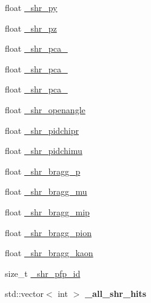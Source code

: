 \begin{DoxyCompactItemize}
\item 
float \hyperlink{classselection_1_1CC0piNpSelection_a436dd7081c84003dabb595289d745111}{\+\_\+shr\+\_\+py}
\item 
float \hyperlink{classselection_1_1CC0piNpSelection_a769319ad32b6ce49c7a5283b246303fa}{\+\_\+shr\+\_\+pz}
\item 
float \hyperlink{classselection_1_1CC0piNpSelection_a47b08d4ae98f51032f431873321914a5}{\+\_\+shr\+\_\+pca\+\_}
\item 
float \hyperlink{classselection_1_1CC0piNpSelection_ae3ce85b9e7002cfac57e433ee131868d}{\+\_\+shr\+\_\+pca\+\_}
\item 
float \hyperlink{classselection_1_1CC0piNpSelection_a7e5a1ac6cd32eec7da00eb45c49df0cd}{\+\_\+shr\+\_\+pca\+\_}
\item 
float \hyperlink{classselection_1_1CC0piNpSelection_a33b26acb3cdb05cb1b81800d8af48a03}{\+\_\+shr\+\_\+openangle}
\item 
float \hyperlink{classselection_1_1CC0piNpSelection_aae9294d7e4803ff991e611ea124769bc}{\+\_\+shr\+\_\+pidchipr}
\item 
float \hyperlink{classselection_1_1CC0piNpSelection_a63840908c268c89d30e6728ac6cb1036}{\+\_\+shr\+\_\+pidchimu}
\item 
float \hyperlink{classselection_1_1CC0piNpSelection_acb447ca93f046abd1540291ba0d41e73}{\+\_\+shr\+\_\+bragg\+\_\+p}
\item 
float \hyperlink{classselection_1_1CC0piNpSelection_a6ef67d022fce5058985773010161b7cb}{\+\_\+shr\+\_\+bragg\+\_\+mu}
\item 
float \hyperlink{classselection_1_1CC0piNpSelection_ae18587d33433c508bd3e371de8db7b32}{\+\_\+shr\+\_\+bragg\+\_\+mip}
\item 
float \hyperlink{classselection_1_1CC0piNpSelection_afa97d9a456bf2255e06c6c5226f25929}{\+\_\+shr\+\_\+bragg\+\_\+pion}
\item 
float \hyperlink{classselection_1_1CC0piNpSelection_a0fae2cdec5a695421cbe2fdfe6e61c9d}{\+\_\+shr\+\_\+bragg\+\_\+kaon}
\item 
size\+\_\+t \hyperlink{classselection_1_1CC0piNpSelection_a21f98860ef8bd0ad8d8e029a47ef6f1e}{\+\_\+shr\+\_\+pfp\+\_\+id}
\item 
std\+::vector$<$ int $>$ {\bfseries \+\_\+all\+\_\+shr\+\_\+hits}\hypertarget{classselection_1_1CC0piNpSelection_ae7edce33eadd6763ac96489ebe5c2c52}{}\label{classselection_1_1CC0piNpSelection_ae7edce33eadd6763ac96489ebe5c2c52}


\end{DoxyCompactItemize}
